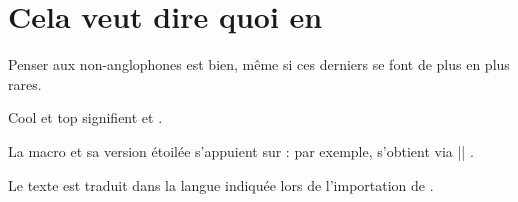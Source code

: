 \documentclass[10pt, a4paper]{article}
\begin{document}
\section{Cela veut dire quoi en }

Penser aux non-anglophones est bien, même si ces derniers se font de plus en plus rares.

\begin{bdoclatex}
Cool et top signifient  et .
\end{bdoclatex}


La macro  et sa version étoilée s'appuient sur  : par exemple,  s'obtient via \bdocinlatex|| .


\begin{bdocnote}
	Le texte  est traduit dans la langue indiquée lors de l'importation de .
\end{bdocnote}
\end{document}
